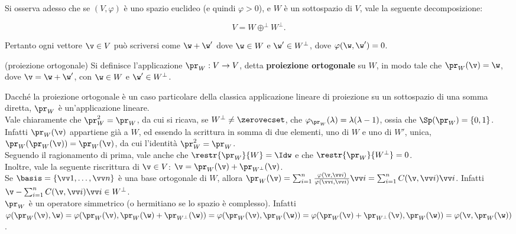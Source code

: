 \documentclass[11pt]{article}
\begin{document}
	\begin{remark}
		Si osserva adesso che se $(V, \varphi)$ è uno spazio euclideo (e quindi $\varphi > 0$), e $W$ è
		un sottospazio di $V$, vale la seguente decomposizione:
		
		\[ V = W \oplus^\perp W^\perp. \]
		
		Pertanto ogni vettore $\v \in V$ può scriversi come $\w + \w'$ dove $\w \in W$ e $\w' \in W^\perp$,
		dove $\varphi(\w, \w') = 0$.
	\end{remark}

	\begin{definition} (proiezione ortogonale)
		Si definisce l'applicazione $\pr_W : V \to V$, detta \textbf{proiezione ortogonale} su $W$,
		in modo tale che $\pr_W(\v) = \w$, dove $\v = \w + \w'$, con $\w \in W$ e $\w' \in W^\perp$.
	\end{definition}

	\begin{remark}\nl
		\li Dacché la proiezione ortogonale è un caso particolare della classica applicazione lineare
		di proiezione su un sottospazio di una somma diretta, $\pr_W$ è un'applicazione lineare. \\
		\li Vale chiaramente che $\pr_W^2 = \pr_W$, da cui si ricava, se $W^\perp \neq \zerovecset$, che
		$\varphi_{\pr_W}(\lambda) = \lambda (\lambda -1)$, ossia che $\Sp(\pr_W) = \{0, 1\}$. Infatti
		$\pr_W(\v)$ appartiene già a $W$, ed essendo la scrittura in somma di due elementi, uno di $W$ e
		uno di $W'$, unica, $\pr_W(\pr_W(\v)) = \pr_W(\v)$, da cui l'identità $\pr_W^2 = \pr_W$. \\
		\li Seguendo il ragionamento di prima, vale anche che $\restr{\pr_W}{W} = \Idw$ e che
		$\restr{\pr_W}{W^\perp} = 0$. \\
		\li Inoltre, vale la seguente riscrittura di $\v \in V$: $\v = \pr_W(\v) + \pr_{W^\perp}(\v)$. \\
		\li Se $\basis = \{ \vv1, \ldots, \vv n \}$ è una base ortogonale di $W$, allora
		$\pr_W(\v) = \sum_{i=1}^n \frac{\varphi(\v, \vv i)}{\varphi(\vv i, \vv i)} \vv i = \sum_{i=1}^n C(\v, \vv i) \vv i$. Infatti $\v -\sum_{i=1}^n C(\v, \vv i) \vv i \in W^\perp$. \\
		\li $\pr_W$ è un operatore simmetrico (o hermitiano se lo spazio è complesso). Infatti $\varphi(\pr_W(\v), \w) =
		\varphi(\pr_W(\v), \pr_W(\w) + \pr_{W^\perp}(\w)) = \varphi(\pr_W(\v), \pr_W(\w)) = \varphi(\pr_W(\v) + \pr_{W^\perp}(\v), \pr_W(\w)) = \varphi(\v, \pr_W(\w))$.
	\end{remark}
\end{document}
